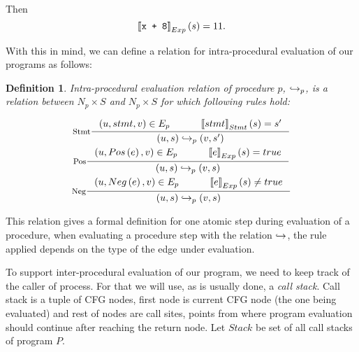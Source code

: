 \documentclass[..thesis.tex]{subfiles}
\newtheorem{defin}{Definition}[section]
\begin{document}
Then 
\begin{equation*}
\left\llbracket \text{\texttt{x + 8}} \right\rrbracket_{Exp} \left( s \right) = 11 \text{.}    
\end{equation*}

With this in mind, we can define a relation for intra-procedural evaluation of our programs as follows:

\begin{defin}
Intra-procedural evaluation relation of procedure $p$, $\hookrightarrow_p$,
is a relation between $N_p \times S$ and $N_p \times S$ for which following rules hold:

\addtolength{\jot}{2em}
\begin{gather*}
  \inference[Stmt]{ \lp u, stmt, v \rp \in E_{p}  \separ  \lllb stmt \rrrb_{Stmt} \lp s \rp = s'}{\lp u, s \rp \intraproc_p \lp v, s' \rp} \\
  \inference[Pos]{ \lp u, Pos \lp e \rp , v \rp \in E_{p} \separ \lllb e \rrrb_{Exp} \lp s \rp = true }{\lp u, s \rp \intraproc_p \lp v, s \rp} \\  
  \inference[Neg]{ \lp u, Neg \lp e \rp , v \rp \in E_{p} \separ \lllb e \rrrb_{Exp} \lp s \rp \neq true }{\lp u, s \rp \intraproc_p \lp v, s \rp} 
\end{gather*}
\addtolength{\jot}{-2em}

\end{defin}


This relation gives a formal definition for one atomic step during evaluation of a procedure, when evaluating a procedure step with the relation $\hookrightarrow$,
the rule applied depends on the type of the edge under evaluation. 


To support inter-procedural evaluation of our program, we need to keep track of the caller of process. For that we will use, as is usually done, a \textit{call stack}.
Call stack is a tuple of CFG nodes, first node is current CFG node (the one being evaluated) and rest of nodes are call sites, points from where program evaluation
 should continue after reaching the return node. Let $Stack$ be set of all call stacks of program $P$. 
\end{document}
